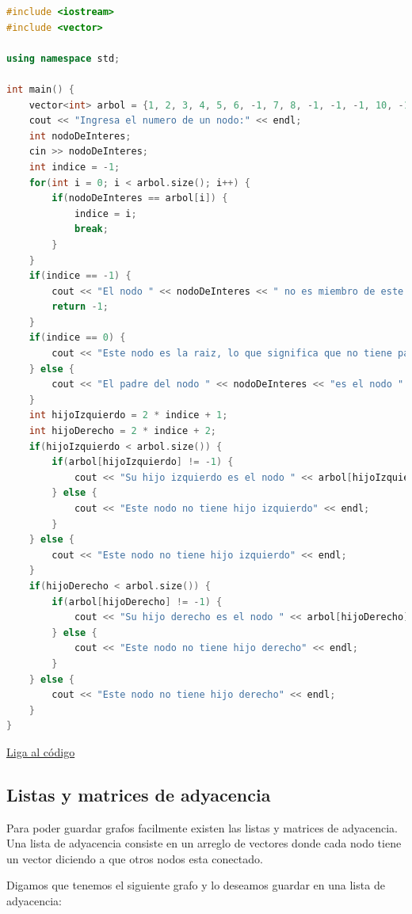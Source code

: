\documentclass{article}
\begin{document}
\begin{lstlisting}[language=C++, title=Arbol de binario]
#include <iostream>
#include <vector>

using namespace std;

int main() {
	vector<int> arbol = {1, 2, 3, 4, 5, 6, -1, 7, 8, -1, -1, -1, 10, -1, -1, 9};
	cout << "Ingresa el numero de un nodo:" << endl;
	int nodoDeInteres;
	cin >> nodoDeInteres;
	int indice = -1;
	for(int i = 0; i < arbol.size(); i++) {
		if(nodoDeInteres == arbol[i]) {
			indice = i;
			break;
		}
	}
	if(indice == -1) {
		cout << "El nodo " << nodoDeInteres << " no es miembro de este arbol" << endl;
		return -1;
	}
	if(indice == 0) {
		cout << "Este nodo es la raiz, lo que significa que no tiene padre" << endl;
	} else {
		cout << "El padre del nodo " << nodoDeInteres << "es el nodo " << arbol[(indice - 1) / 2] << endl;
	}
	int hijoIzquierdo = 2 * indice + 1;
	int hijoDerecho = 2 * indice + 2;
	if(hijoIzquierdo < arbol.size()) {
		if(arbol[hijoIzquierdo] != -1) {
			cout << "Su hijo izquierdo es el nodo " << arbol[hijoIzquierdo] << endl;
		} else {
			cout << "Este nodo no tiene hijo izquierdo" << endl;
		}
	} else {
		cout << "Este nodo no tiene hijo izquierdo" << endl;
	}
	if(hijoDerecho < arbol.size()) {
		if(arbol[hijoDerecho] != -1) {
			cout << "Su hijo derecho es el nodo " << arbol[hijoDerecho] << endl;
		} else {
			cout << "Este nodo no tiene hijo derecho" << endl;
		}
	} else {
		cout << "Este nodo no tiene hijo derecho" << endl;
	}
}
\end{lstlisting}
\href{https://repl.it/@Jamesscn/Arboles-Binarios}{Liga al código}

\subsection{Listas y matrices de adyacencia}

Para poder guardar grafos facilmente existen las listas y matrices de adyacencia. Una lista de adyacencia consiste en un arreglo de vectores donde cada nodo tiene un vector diciendo a que otros nodos esta conectado.

Digamos que tenemos el siguiente grafo y lo deseamos guardar en una lista de adyacencia:
\end{document}
